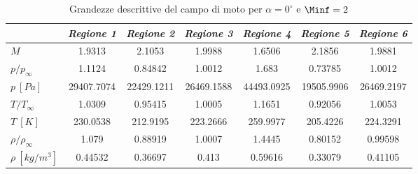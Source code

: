 \begin{table} [H]\centering {}\begin{tabular}{l  c  c c c c c}    \toprule&    \emph{Regione 1}& \emph{Regione 2}& \emph{Regione 3}& \emph{Regione 4}& \emph{Regione 5}& \emph{Regione 6}   \\  \midrule$M$ &1.9313 &2.1053 &1.9988 &1.6506 &2.1856 &1.9881 \\$p/p_{\infty}$ &1.1124 &0.84842 &1.0012 &1.683 &0.73785 &1.0012 \\$p \ [\si{Pa}]$ &29407.7074 &22429.1211 &26469.1588 &44493.0925 &19505.9906 &26469.2197 \\$T/T_{\infty}$ &1.0309&0.95415&1.0005&1.1651&0.92056&1.0053\\$T \ [K]$ &230.0538&212.9195&223.2666&259.9977&205.4226&224.3291\\$\rho/\rho_{\infty}$ &1.079&0.88919&1.0007&1.4445&0.80152&0.99598\\$\rho \ [kg/m^3]$ &0.44532&0.36697&0.413&0.59616&0.33079&0.41105\\\bottomrule\end{tabular}\caption {\footnotesize Grandezze descrittive del campo di moto per $\alpha=0^\circ$ e $\Minf=2$}\label{tabS10}\end{table}				





